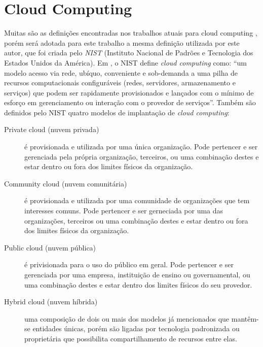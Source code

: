 \chapter{Cloud Computing}
\label{cha:fundamentacao_teorica}

Muitas são as definições encontradas nos trabalhos atuais para cloud computing
\cite{article-learning-as-a-service}, porém será adotada para este trabalho a mesma definição utilizada
por este autor, que foi criada pelo \emph{NIST} (Instituto Nacional de Padrões e Tecnologia dos Estados
Unidos da América). Em , o NIST define \emph{cloud computing} como:
``um modelo acesso via rede, ubíquo, conveniente e sob-demanda a uma pilha de recursos computacionais
configuráveis (redes, servidores, armazenamento e serviços) que podem ser rapidamente provisionados e
lançados com o mínimo de esforço em gerenciamento ou interação com o provedor de serviços''. Também
são definidos pelo NIST quatro modelos de implantação de \emph{cloud computing}:

\begin{description}
    \item[Private cloud (nuvem privada)] é provisionada e utilizada por uma única
    organização. Pode pertencer e ser gerenciada pela própria organização, terceiros,
    ou uma combinação destes e estar dentro ou fora dos limites físicos da
    organização.

    \item[Community cloud (nuvem comunitária)] é provisionada e utilizada por uma
    comunidade de organizações que tem interesses comuns. Pode pertencer e ser gerneciada
    por uma das organizações, terceiros ou uma combinação destes e estar dentro ou fora
    dos limites físicos da organização.

    \item[Public cloud (nuvem pública)] é privisionada para o uso do público em geral.
    Pode pertencer e ser gerenciada por uma empresa, instituição de ensino ou governamental,
    ou uma combinação destes e estar dentro dos limites físicos do seu provedor.

    \item[Hybrid cloud (nuvem híbrida)] uma composição de dois ou mais dos modelos
    já mencionados que mantêm-se entidades únicas, porém são ligadas por tecnologia
    padronizada ou proprietária que possibilita compartilhamento de recursos entre
    elas.
\end{description}


